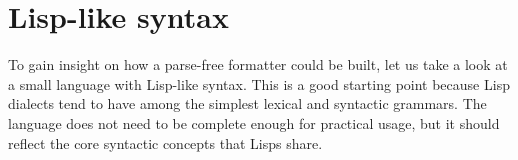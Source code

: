 \chapter{Lisp-like syntax}
To gain insight on how a parse-free formatter could be built,
let us take a look at a small language with Lisp-like syntax.
This is a good starting point because Lisp dialects tend to
have among the simplest lexical and syntactic grammars.
The language does not need to be complete enough for practical usage,
but it should reflect the core syntactic concepts that Lisps share.










